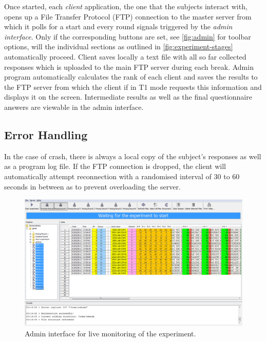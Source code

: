 \documentclass[a4paper,11pt,oneside]{article}
\begin{document}
Once started, each \emph{client} application, the one that the subjects interact with, opens up a File Transfer Protocol (FTP) connection to the master server from which it polls for a start and every round signals triggered by the \emph{admin interface}. Only if the corresponding buttons are set, see \autoref{fig:admin} for toolbar options, will the individual sections as outlined in \autoref{fig:experiment-stages} automatically proceed. Client saves locally a text file with all so far collected responses which is uploaded to the main FTP server during each break. Admin program automatically calculates the rank of each client and saves the results to the FTP server from which the client if in T1 mode requests this information and displays it on the screen. Intermediate results as well as the final questionnaire answers are viewable in the admin interface. 

\subsection{Error Handling}

In the case of crash, there is always a local copy of the subject's responses as well as a program log file. If the FTP connection is dropped, the client will automatically attempt reconnection with a randomised interval of 30 to 60 seconds in between as to prevent overloading the server.




\begin{figure}[!htb]
  \begin{center}
    \includegraphics[width=\linewidth]{images/admin.pdf}
    \caption{Admin interface for live monitoring of the experiment.}
      \label{fig:admin}
  \end{center}  
\end{figure}
\end{document}
